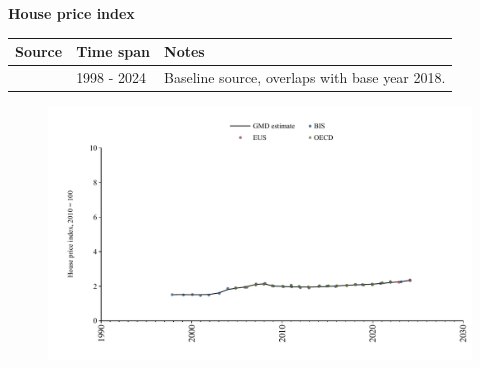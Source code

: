 \documentclass[12pt,a4paper,landscape]{article}
\begin{document}
\begin{adjustbox}{max totalsize={\paperwidth}{\paperheight},center}
\begin{minipage}[t][\textheight][t]{\textwidth}
\vspace*{0.5cm}
{}
\begin{center}
{\Large\bfseries House price index}
\end{center}
\vspace{0.5cm}
\begin{table}[H]
\centering
\small
\begin{tabular}{|l|l|l|}
\hline
\textbf{Source} & \textbf{Time span} & \textbf{Notes} \\
\hline
\rowcolor{white}\cite{BIS}& 1998 - 2024 &Baseline source, overlaps with base year 2018. \\
\hline
\end{tabular}
\end{table}
\begin{figure}[H]
\centering
\includegraphics[width=\textwidth,height=0.6\textheight,keepaspectratio]{graphs/BGR_HPI.pdf}
\end{figure}
\end{minipage}
\end{adjustbox}
\end{document}
